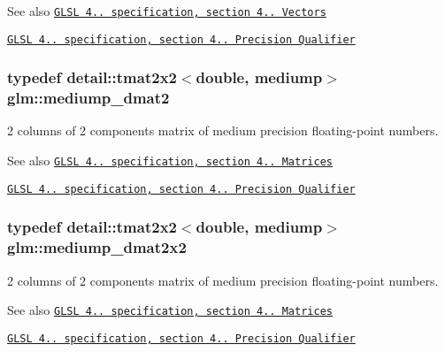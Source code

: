 \begin{DoxySeeAlso}{See also}
\href{http://www.opengl.org/registry/doc/GLSLangSpec.4.20.8.pdf}{\tt G\+L\+SL 4.. specification, section 4.. Vectors} 

\href{http://www.opengl.org/registry/doc/GLSLangSpec.4.20.8.pdf}{\tt G\+L\+SL 4.. specification, section 4.. Precision Qualifier} 
\end{DoxySeeAlso}
\subsubsection[{\texorpdfstring{mediump\+\_\+dmat2}{mediump_dmat2}}]{\setlength{\rightskip}{0pt plus 5cm}typedef detail\+::tmat2x2$<$double, mediump$>$ {\bf glm\+::mediump\+\_\+dmat2}}\hypertarget{group__core__precision_gac056ec9d1c37e591172544088163b7e4}{}\label{group__core__precision_gac056ec9d1c37e591172544088163b7e4}
2 columns of 2 components matrix of medium precision floating-\/point numbers.

\begin{DoxySeeAlso}{See also}
\href{http://www.opengl.org/registry/doc/GLSLangSpec.4.20.8.pdf}{\tt G\+L\+SL 4.. specification, section 4.. Matrices} 

\href{http://www.opengl.org/registry/doc/GLSLangSpec.4.20.8.pdf}{\tt G\+L\+SL 4.. specification, section 4.. Precision Qualifier} 
\end{DoxySeeAlso}
\subsubsection[{\texorpdfstring{mediump\+\_\+dmat2x2}{mediump_dmat2x2}}]{\setlength{\rightskip}{0pt plus 5cm}typedef detail\+::tmat2x2$<$double, mediump$>$ {\bf glm\+::mediump\+\_\+dmat2x2}}\hypertarget{group__core__precision_ga88ddb4188060ab00fee67c9840f4417e}{}\label{group__core__precision_ga88ddb4188060ab00fee67c9840f4417e}
2 columns of 2 components matrix of medium precision floating-\/point numbers.

\begin{DoxySeeAlso}{See also}
\href{http://www.opengl.org/registry/doc/GLSLangSpec.4.20.8.pdf}{\tt G\+L\+SL 4.. specification, section 4.. Matrices} 

\href{http://www.opengl.org/registry/doc/GLSLangSpec.4.20.8.pdf}{\tt G\+L\+SL 4.. specification, section 4.. Precision Qualifier} 
\end{DoxySeeAlso}
